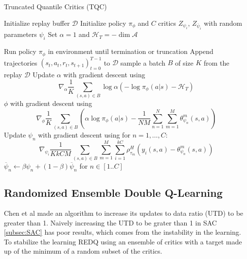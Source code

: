 \begin{algorithm}[H]
\caption{Truncated Quantile Critics (TQC)}
\begin{algorithmic}[1]
\State Initialize replay buffer $\mathcal{D}$
\State Initialize policy $\pi_{\phi}$ and $C$ critics $Z_{\psi_i}$, $Z_{\overline{\psi}_i}$ with random parameters $\psi_i$
\State Set $\alpha = 1$ and $\mathcal{H}_T = -\dim \mathcal{A}$

\Repeat
    \State Run policy $\pi_{\phi}$ in environment until termination or truncation
    \State Append trajectories $(s_t, a_t, r_t, s_{t+1})_{t=0}^{T-1}$ to $\mathcal{D}$
        \State sample a batch $B$ of size $K$ from the replay $\mathcal{D}$
        \State Update $\alpha$ with gradient descent using
        \[
        \nabla_{\alpha} \frac{1}{K} \sum_{(s,a)\in B} \log \alpha (-\log \pi_{\phi}(a|s)- \mathcal{H}_T) 
        \]
        \State $\phi$ with gradient descent using
        \[
        \nabla_{\phi} \frac{1}{K} \sum_{(s,a) \in B}\left(\alpha \log \pi_\phi(a|s) - \frac{1}{NM} \sum_{n=1}^{N} \sum_{m=1}^{M} \theta_{\psi_n}^m(s, a)\right)
        \]
        \State Update $\psi_n$ with gradient descent using for $n=1,\ldots,C$:
        \[
            \nabla_{\psi_i} \frac{1}{KkCM} \sum_{(s,a) \in B} \sum_{m=1}^M \sum_{i=1}^{kC} \rho_{\tau_m}^H \left( y_i(s,a) - \theta_{\psi_n}^{m}(s,a)\right)
        \]
        \vspace{1pt}
        \State  $\overline{\psi}_n \leftarrow  \beta \psi_n  + (1 - \beta) \overline{\psi}_n $ for $n\in[1..C]$
    \EndFor
{}
\end{algorithmic}
\end{algorithm}


\subsection{Randomized Ensemble Double Q-Learning}\label{subsec:REDQ}

Chen et al \cite{chenRandomizedEnsembledDouble2021} made an algorithm to increase its updates to data ratio (UTD) to be greater than 1. Naively increasing the UTD to be grater than 1 in SAC \ref{subsec:SAC} has poor results, which comes from the instability in the learning. To stabilize the learning REDQ using an ensemble of critics with a target made up of the minimum of a random subset of the critics.

